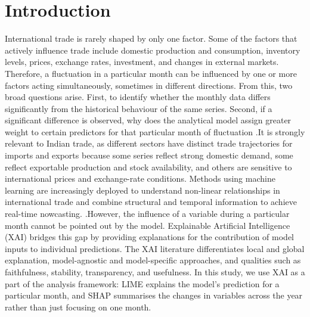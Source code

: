 \documentclass[pdftex,sn-mathphys-num]{sn-jnl}
\begin{document}

\maketitle

\section{Introduction}
International trade is rarely shaped by only one factor. Some of the factors that actively influence trade include domestic production and consumption, inventory levels, prices, exchange rates, investment, and changes in external markets. Therefore, a fluctuation in a particular month can be influenced by one or more factors acting simultaneously, sometimes in different directions. From this, two broad questions arise. First, to identify whether the monthly data differs significantly from the historical behaviour of the same series. Second, if a significant difference is observed, why does the analytical model assign greater weight to certain predictors for that particular month of fluctuation
.It is strongly relevant to Indian trade, as different sectors have distinct trade trajectories for imports and exports because some series reflect strong domestic demand, some reflect exportable production and stock availability, and others are sensitive to international prices and exchange-rate conditions. Methods using machine learning are increasingly deployed to understand non-linear relationships in international trade and combine structural and temporal information to achieve real-time nowcasting.
 \cite{josic2022,chinn2023,yang2023}.However, the influence of a variable during a particular month cannot be pointed out by the model. Explainable Artificial Intelligence (XAI) bridges this gap by providing explanations for the contribution of model inputs to individual predictions. The XAI
literature differentiates local and global explanation, model-agnostic and model-specific
approaches, and qualities such as faithfulness, stability, transparency, and usefulness\cite{guidotti2018,arrieta2020,schwalbe2024,mersha2024,abusitta2024,longo2024}. In this study, we use XAI as a part of the analysis framework: LIME explains the model's prediction for a particular month, and SHAP summarises the changes in variables across the year rather than just focusing on one month.
\end{document}
